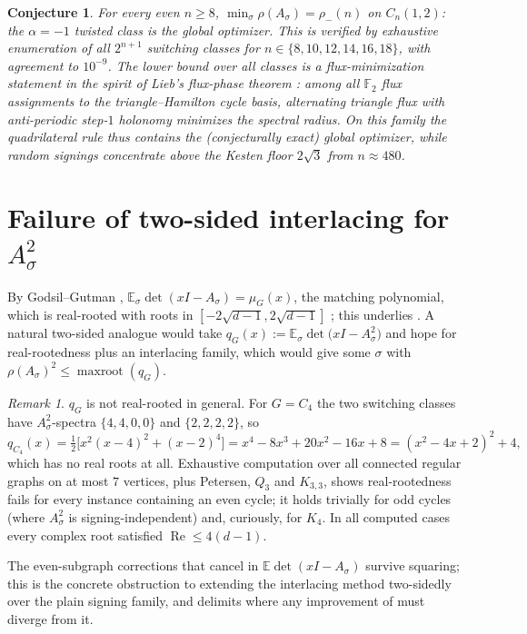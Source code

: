 \documentclass[11pt]{article}
\newtheorem{conjecture}[lemma]{Conjecture}
\theoremstyle{remark}
\newtheorem{remark}[lemma]{Remark}
\newcommand{\F}{\mathbb{F}}
\newcommand{\rhomax}{\rho}
\begin{document}
\begin{conjecture}\label{conj:circ}
For every even $n\ge8$,
$\min_\sigma\rhomax(A_\sigma)=\rho_-(n)$ on $C_n(1,2)$: the $\alpha=-1$
twisted class is the global optimizer. This is verified by exhaustive
enumeration of all $2^{n+1}$ switching classes for
$n\in\{8,10,12,14,16,18\}$, with agreement to $10^{-9}$. The lower
bound over all classes is a flux-minimization statement in the spirit of
Lieb's flux-phase theorem \cite{lieb94}: among all $\F_2$ flux
assignments to the triangle--Hamilton cycle basis, alternating triangle
flux with anti-periodic step-$1$ holonomy minimizes the spectral radius.
On this family the quadrilateral rule thus contains the (conjecturally
exact) global optimizer, while random signings concentrate \emph{above}
the Kesten floor $2\sqrt3$ from $n\approx480$.
\end{conjecture}

\section{Failure of two-sided interlacing for $A_\sigma^2$}

By Godsil--Gutman \cite{godsilgutman81},
$\mathbb{E}_\sigma\det(xI-A_\sigma)=\mu_G(x)$, the matching polynomial,
which is real-rooted with roots in $[-2\sqrt{d-1},2\sqrt{d-1}]$
\cite{heilmannlieb72}; this underlies \cite{mss15}. A natural two-sided
analogue would take
$q_G(x):=\mathbb{E}_\sigma\det\!\big(xI-A_\sigma^2\big)$ and hope for
real-rootedness plus an interlacing family, which would give some
$\sigma$ with $\rhomax(A_\sigma)^2\le\operatorname{maxroot}(q_G)$.

\begin{remark}\label{rem:qG}
$q_G$ is not real-rooted in general. For $G=C_4$ the two switching
classes have $A_\sigma^2$-spectra $\{4,4,0,0\}$ and $\{2,2,2,2\}$, so
\[
q_{C_4}(x)=\tfrac12\big[x^2(x-4)^2+(x-2)^4\big]
=x^4-8x^3+20x^2-16x+8=(x^2-4x+2)^2+4,
\]
which has no real roots at all. Exhaustive computation over all
connected regular graphs on at most $7$ vertices, plus Petersen, $Q_3$
and $K_{3,3}$, shows real-rootedness fails for every instance containing
an even cycle; it holds trivially for odd cycles (where
$A_\sigma^2$ is signing-independent) and, curiously, for $K_4$. In all
computed cases every complex root satisfied
$\operatorname{Re}\le4(d-1)$.
\end{remark}

The even-subgraph corrections that cancel in
$\mathbb{E}\det(xI-A_\sigma)$ survive squaring; this is the concrete
obstruction to extending the interlacing method two-sidedly over the
plain signing family, and delimits where any improvement of
\cite{xuzhang26} must diverge from it.
\end{document}
